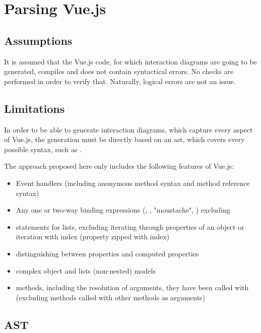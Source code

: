 \section{Parsing Vue.js}

\subsection{Assumptions}
It is assumed that the Vue.js code, for which interaction diagrams are going to be generated, compiles and does not contain syntactical errors. No checks are performed in order to verify that. Naturally, logical errors are not an issue.
\subsection{Limitations}
\label{concept:parsing_limits}

In order to be able to generate interaction diagrams, which capture every aspect of Vue.js, the generation must be directly based on an \gls{ast}, which covers every possible syntax, such as \cite{eslint_vue_parser}. 

The approach proposed here only includes the following features of Vue.js:
\begin{itemize}
    \item Event handlers (including anonymous method syntax and method reference syntax)
    \item Any one or two-way binding expressions (, , "moustache", ) excluding 
    \item {} statements for lists, excluding iterating through properties of an object or iteration with index (property zipped with index)
    \item distinguishing between properties and computed properties
    \item complex object and lists (non-nested) models 
    \item methods, including the resolution of arguments, they have been called with (excluding methods called with other methods as arguments)
\end{itemize}

\subsection{AST}


